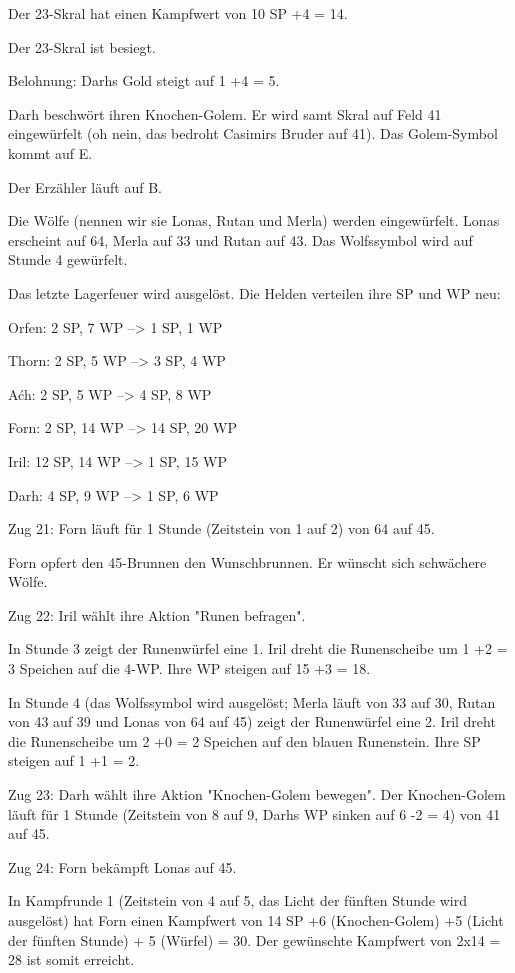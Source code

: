 \documentclass[10pt, a4paper, oneside]{book}
\begin{document}
{Der 23-Skral hat einen Kampfwert von 10 SP +4 = 14.

Der 23-Skral ist besiegt.

Belohnung: Darhs Gold steigt auf 1 +4 = 5.

Darh beschwört ihren Knochen-Golem. Er wird samt Skral auf Feld 41 eingewürfelt (oh nein, das bedroht Casimirs Bruder auf 41). Das Golem-Symbol kommt auf E.

Der Erzähler läuft auf B.

Die Wölfe (nennen wir sie Lonas, Rutan und Merla) werden eingewürfelt. Lonas erscheint auf 64, Merla auf 33 und Rutan auf 43. Das Wolfssymbol wird auf Stunde 4 gewürfelt.

Das letzte Lagerfeuer wird ausgelöst. Die Helden verteilen ihre SP und WP neu:



Orfen: 2 SP, 7 WP –> 1 SP, 1 WP

Thorn: 2 SP, 5 WP –> 3 SP, 4 WP

Aćh: 2 SP, 5 WP –> 4 SP, 8 WP

Forn: 2 SP, 14 WP –> 14 SP, 20 WP

Iril: 12 SP, 14 WP –> 1 SP, 15 WP

Darh: 4 SP, 9 WP –> 1 SP, 6 WP



Zug 21: Forn läuft für 1 Stunde (Zeitstein von 1 auf 2) von 64 auf 45.

Forn opfert den 45-Brunnen den Wunschbrunnen. Er wünscht sich schwächere Wölfe.



Zug 22: Iril wählt ihre Aktion "Runen befragen".

In Stunde 3 zeigt der Runenwürfel eine 1. Iril dreht die Runenscheibe um 1 +2 = 3 Speichen auf die 4-WP. Ihre WP steigen auf 15 +3 = 18.

In Stunde 4 (das Wolfssymbol wird ausgelöst; Merla läuft von 33 auf 30, Rutan von 43 auf 39 und Lonas von 64 auf 45) zeigt der Runenwürfel eine 2. Iril dreht die Runenscheibe um 2 +0 = 2 Speichen auf den blauen Runenstein. Ihre SP steigen auf 1 +1 = 2.



Zug 23: Darh wählt ihre Aktion "Knochen-Golem bewegen". Der Knochen-Golem läuft für 1 Stunde (Zeitstein von 8 auf 9, Darhs WP sinken auf 6 -2 = 4) von 41 auf 45.



Zug 24: Forn bekämpft Lonas auf 45.

In Kampfrunde 1 (Zeitstein von 4 auf 5, das Licht der fünften Stunde wird ausgelöst) hat Forn einen Kampfwert von 14 SP +6 (Knochen-Golem) +5 (Licht der fünften Stunde) + 5 (Würfel) = 30. Der gewünschte Kampfwert von 2x14 = 28 ist somit erreicht.

}
\end{document}
